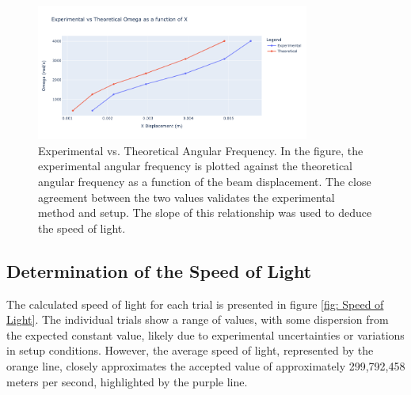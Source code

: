 \documentclass[12pt]{article}
\begin{document}
        \begin{figure}[!h]
                \centering
                \includegraphics[width=0.80\textwidth]{../Imgs/plot3.png}
                \caption{Experimental vs. Theoretical Angular Frequency. In the figure, the experimental
                angular frequency is plotted against the theoretical angular frequency as a function of the
                beam displacement. The close agreement between the two values validates the experimental method
                and setup. The slope of this relationship was used to deduce the speed of light.}
                \label{fig: Experimental vs. Theoretical Angular Frequency}
        \end{figure}
        
        \subsection{Determination of the Speed of Light}
        The calculated speed of light for each trial is presented in figure \ref{fig: Speed of Light}. The individual trials show a range of values, with some dispersion from the expected constant value, likely due to experimental uncertainties or variations in setup conditions. However, the average speed of light, represented by the orange line, closely approximates the accepted value of approximately 299,792,458 meters per second, highlighted by the purple line.
        
\end{document}

